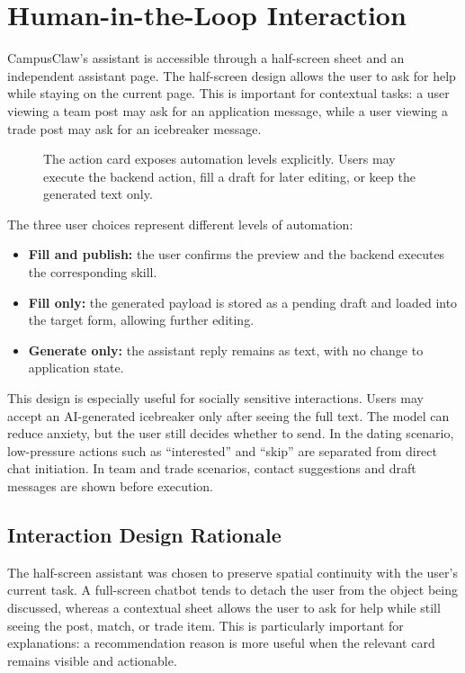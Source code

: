 \documentclass[sigconf]{acmart}
\begin{document}
\section{Human-in-the-Loop Interaction}
CampusClaw's assistant is accessible through a half-screen sheet and an independent assistant page. The half-screen design allows the user to ask for help while staying on the current page. This is important for contextual tasks: a user viewing a team post may ask for an application message, while a user viewing a trade post may ask for an icebreaker message.

\begin{figure}[t]
\centering
{}
\caption{The action card exposes automation levels explicitly. Users may execute the backend action, fill a draft for later editing, or keep the generated text only.}
\label{fig:hitl}
\end{figure}

The three user choices represent different levels of automation:
\begin{itemize}
    \item \textbf{Fill and publish:} the user confirms the preview and the backend executes the corresponding skill.
    \item \textbf{Fill only:} the generated payload is stored as a pending draft and loaded into the target form, allowing further editing.
    \item \textbf{Generate only:} the assistant reply remains as text, with no change to application state.
\end{itemize}

This design is especially useful for socially sensitive interactions. Users may accept an AI-generated icebreaker only after seeing the full text. The model can reduce anxiety, but the user still decides whether to send. In the dating scenario, low-pressure actions such as ``interested'' and ``skip'' are separated from direct chat initiation. In team and trade scenarios, contact suggestions and draft messages are shown before execution.

\subsection{Interaction Design Rationale}
The half-screen assistant was chosen to preserve spatial continuity with the user's current task. A full-screen chatbot tends to detach the user from the object being discussed, whereas a contextual sheet allows the user to ask for help while still seeing the post, match, or trade item. This is particularly important for explanations: a recommendation reason is more useful when the relevant card remains visible and actionable.
\end{document}
